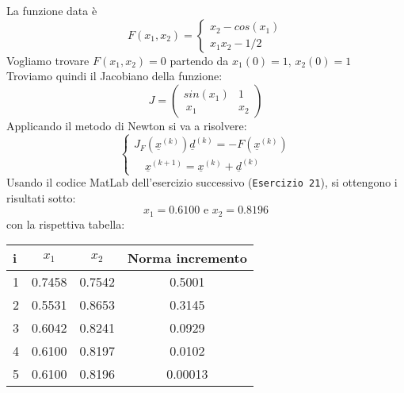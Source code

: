 \begin{flushleft}
La funzione data è \[F(x_1, x_2)= \begin{cases}x_2-cos(x_1)\\ x_1x_2 -1/2\end{cases}\]
Vogliamo trovare $F(x_1, x_2)=0$ partendo da $x_1(0) = 1\mbox{, } x_2(0) = 1$\\
Troviamo quindi il Jacobiano della funzione: 
\[ 
J=\begin{pmatrix} sin(x_1) & 1  \\\ x_1 & x_2 \end{pmatrix}
\]
Applicando il metodo di Newton si va a risolvere:
\[
\begin{cases} 
J_F(\underline{x}^{(k)})\underline{d}^{(k)}=-F(\underline{x}^{(k)}) \\ 
\quad \underline{x}^{(k+1)}=\underline{x}^{(k)}+\underline{d}^{(k)} 
\end{cases}
\]
Usando il codice MatLab dell'esercizio successivo (\texttt{Esercizio 21}), si ottengono i risultati sotto:
\[
 x_1 = 0.6100 \mbox{ e } x_2 =0.8196
\]
con la rispettiva tabella:
\begin{center}
\begin{tabular}{l|c|c|c}
i & $x_1$ & $x_2$ & Norma incremento \\
\hline
1 & 0.7458 & 0.7542 & 0.5001 \\
2 & 0.5531 & 0.8653 & 0.3145 \\
3 & 0.6042 & 0.8241 & 0.0929 \\
4 & 0.6100 & 0.8197 & 0.0102 \\
5 & 0.6100 & 0.8196 & 0.00013 \\ 
\end{tabular}
\end{center}
\end{flushleft}